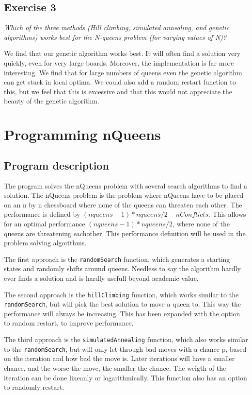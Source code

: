 \documentclass{article}
\begin{document}
\subsection*{Exercise 3}


\textit{Which of the three methods (Hill climbing, simulated annealing, and genetic algorithms) works best for the N-queens problem (for varying values of N)?}

We find that our genetic algorithm works best. It will often find a solution very quickly, even for very large boards. Moreover, the implementation is far more interesting. We find that for large numbers of queens even the genetic algorithm can get stuck in local optima. We could also add a random restart function to this, but we feel that this is excessive and that this would not appreciate the beauty of the genetic algorithm.


\section*{Programming nQueens} 
\subsection*{Program description}
The program solves the nQueens problem with several search algorithms to find a solution. The nQueens problem is the problem where nQueens have to be placed on an n by n chessboard where none of the queens can threaten each other.
The performance is defined by $ (nqueens-1)*nqueens/2 -nConflicts$. This allows for an optimal performance $(nqueens-1)*nqueens/2$, where none of the queens are threatening eachother. This performance definition will be used in the problem solving algorithms.

The first approach is the \verb!randomSearch! function, which generates a starting states and randomly shifts around queens. Needless to say the algorithm hardly ever finds a solution and is hardly usefull beyond academic value.

The second approach is the \verb!hillClimbing! function, which works similar to the \verb!randomSearch!, but will pick the best solution to move a queen to. This way the performance will always be increasing. This has been expanded with the option to random restart, to improve performance.

The third approach is the \verb!simulatedAnnealing! function, which also works similar to the \verb!randomSearch!, but will only let through bad moves with a chance p, based on the iteration and how bad the move is. Later iterations will have a smaller chance, and the worse the move, the smaller the chance. The weigth of the iteration can be done lineanly or logarithmically. This function also has an option to randomly restart.
\end{document}
